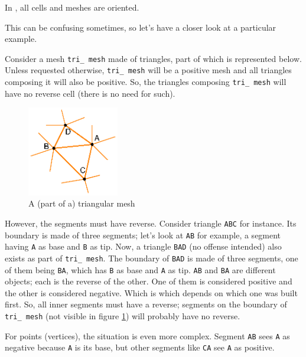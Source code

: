 In \maniFEM, all cells and meshes are oriented.

This can be confusing sometimes, so let's have a closer look at a particular example.

Consider a mesh {\small\tt tri\_\,mesh} made of triangles, part of which is represented below.
Unless requested otherwise, {\small\tt tri\_\,mesh} will be a positive mesh and all triangles
composing it will also be positive.
So, the triangles composing {\small\tt tri\_\,mesh} will have no reverse cell
(there is no need for such).

\begin{figure}[ht] \centering
  \includegraphics[width=40mm]{malha-tri}
  \caption{A (part of a) triangular mesh}
  \label{\numb section 9.\numb fig 2}
\end{figure}

However, the segments must have reverse.
Consider triangle {\small\tt ABC} for instance.
Its boundary is made of three segments; let's look at {\small\tt AB} for example,
a segment having {\small\tt A} as base and {\small\tt B} as tip.
Now, a triangle {\small\tt BAD} (no offense intended) also exists as part of
{\small\tt tri\_\,mesh}.
The boundary of {\small\tt BAD} is made of three segments, one of them being {\small\tt BA},
which has {\small\tt B} as base and {\small\tt A} as tip.
{\small\tt AB} and {\small\tt BA} are different {\small\tt {}} objects;
each is the reverse of the other.
One of them is considered positive and the other is considered negative.
Which is which depends on which one was built first.
So, all inner segments must have a reverse;
segments on the boundary of {\small\tt tri\_\,mesh} (not visible in figure
\ref{\numb section 9.\numb fig 2}) will probably have no reverse.

For points (vertices), the situation is even more complex.
Segment {\small\tt AB} sees {\small\tt A} as negative because {\small\tt A} is its base,
but other segments like {\small\tt CA} see {\small\tt A} as positive.

